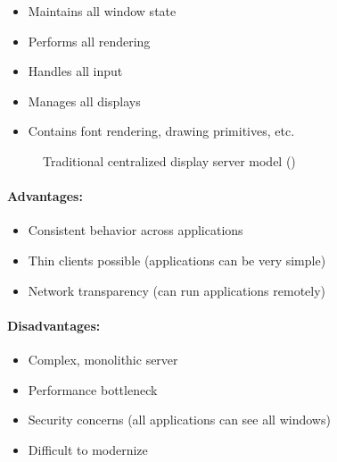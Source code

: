 \begin{itemize}[leftmargin=*]
    \item Maintains all window state
    \item Performs all rendering
    \item Handles all input
    \item Manages all displays
    \item Contains font rendering, drawing primitives, etc.
\end{itemize}

\begin{figure}[htbp]
\centering
{}
\caption{Traditional centralized display server model (\xorg{})}
\label{fig:x11-model}
\end{figure}

\paragraph{Advantages:}
\begin{itemize}[leftmargin=*]
    \item Consistent behavior across applications
    \item Thin clients possible (applications can be very simple)
    \item Network transparency (can run applications remotely)
\end{itemize}

\paragraph{Disadvantages:}
\begin{itemize}[leftmargin=*]
    \item Complex, monolithic server
    \item Performance bottleneck
    \item Security concerns (all applications can see all windows)
    \item Difficult to modernize
\end{itemize}

